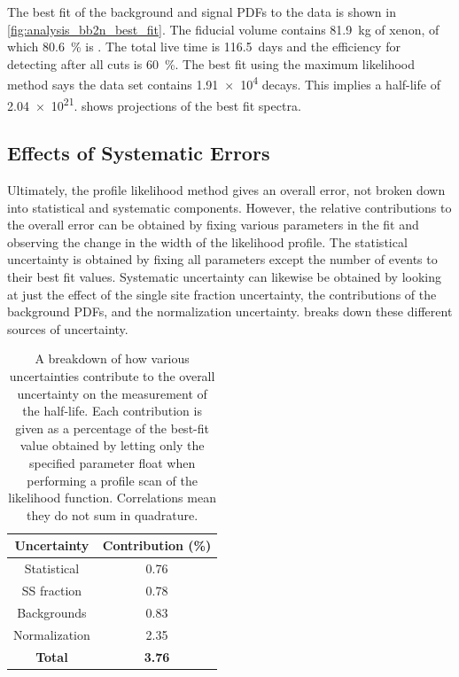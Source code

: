 \documentclass[herrin-thesis.tex]{subfiles}
\begin{document}
The best fit of the background and signal PDFs to the data is shown in \cref{fig:analysis_bb2n_best_fit}. The fiducial volume contains \SI{81.9}{\kg} of xenon, of which \SI{80.6}{\percent} is . The total live time is \SI{116.5}{days} and the efficiency for detecting \twonu{} after all cuts is \SI{60}{\percent}. The best fit using the maximum likelihood method says the data set contains \num{1.91e4} \twonu{} decays. This implies a half-life of \SI{2.04e21}{\year}.  shows projections of the best fit spectra.

\subsection{Effects of Systematic Errors}
Ultimately, the profile likelihood method gives an overall error, not broken down into statistical and systematic components. However, the relative contributions to the overall error can be obtained by fixing various parameters in the fit and observing the change in the width of the likelihood profile. The statistical uncertainty is obtained by fixing all parameters except the number of \twonu{} events to their best fit values. Systematic uncertainty can likewise be obtained by looking at just the effect of the single site fraction uncertainty, the contributions of the background PDFs, and the normalization uncertainty.  breaks down these different sources of uncertainty.

\begin{table}[htbp]
\centering
\caption[Effects of uncertainties on the half-life measurement]{A breakdown of how various uncertainties contribute to the overall uncertainty on the measurement of the \twonu{} half-life. Each contribution is given as a percentage of the best-fit value obtained by letting only the specified parameter float when performing a profile scan of the likelihood function. Correlations mean they do not sum in quadrature.}
\label{tab:analysis_error_budget}
\begin{tabular}{c c}\toprule
Uncertainty	&	Contribution (\%)	\\\midrule
Statistical		&	0.76				\\
SS fraction	&	0.78				\\
Backgrounds	&	0.83				\\
Normalization	&	2.35				\\\midrule
\textbf{Total}	&	\textbf{3.76}		\\\bottomrule
\end{tabular}
\end{table}
\end{document}
